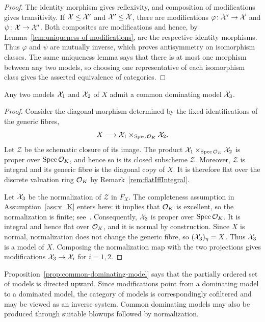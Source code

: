 \begin{proof}
    The identity morphism gives reflexivity, and composition of modifications gives transitivity.
    If $\mathcal X\leq\mathcal X'$ and $\mathcal X'\leq\mathcal X$, there are modifications $\varphi\colon\mathcal X'\to\mathcal X$ and $\psi\colon\mathcal X\to\mathcal X'$.
    Both composites are modifications and hence, by Lemma~\ref{lem:uniqueness-of-modifications}, are the respective identity morphisms.
    Thus $\varphi$ and $\psi$ are mutually inverse, which proves antisymmetry on isomorphism classes.
    The same uniqueness lemma says that there is at most one morphism between any two models, so choosing one representative of each isomorphism class gives the asserted equivalence of categories.
\end{proof}

\begin{proposition}\label{prop:common-dominating-model}
    Any two models $\mathcal X_1$ and $\mathcal X_2$ of $X$ admit a common dominating model $\mathcal X_3$.
\end{proposition}

\begin{proof}
    Consider the diagonal morphism determined by the fixed identifications of the generic fibres,
    \[
        X\longrightarrow\mathcal X_1\times_{\operatorname{Spec}\mathcal O_K}\mathcal X_2.
    \]
    Let $\mathcal Z$ be the schematic closure of its image.
    The product $\mathcal X_1\times_{\operatorname{Spec}\mathcal O_K}\mathcal X_2$ is proper over $\operatorname{Spec}\mathcal O_K$, and hence so is its closed subscheme $\mathcal Z$.
    Moreover, $\mathcal Z$ is integral and its generic fibre is the diagonal copy of $X$.
    It is therefore flat over the discrete valuation ring $\mathcal O_K$ by Remark~\ref{rem:flatIffIntegral}.

    Let $\mathcal X_3$ be the normalization of $\mathcal Z$ in $F_X$.
    The completeness assumption in Assumption~\ref{ass:v_K} enters here: it implies that $\mathcal O_K$ is excellent, so the normalization is finite; see~\cite[Chapter 8, in particular Theorem 8.2.39 (d)]{Liu}.
    Consequently, $\mathcal X_3$ is proper over $\operatorname{Spec}\mathcal O_K$.
    It is integral and hence flat over $\mathcal O_K$, and it is normal by construction.
    Since $X$ is normal, normalization does not change the generic fibre, so $(\mathcal X_3)_\eta=X$.
    Thus $\mathcal X_3$ is a model of $X$.
    Composing the normalization map with the two projections gives modifications $\mathcal X_3\to\mathcal X_i$ for $i=1,2$.
\end{proof}

\begin{remark}\label{rem:models-form-cofiltered-category}
    Proposition~\ref{prop:common-dominating-model} says that the partially ordered set of models is directed upward.
    Since modifications point from a dominating model to a dominated model, the category of models is correspondingly cofiltered and may be viewed as an inverse system.
    Common dominating models may also be produced through suitable blowups followed by normalization.
\end{remark}

